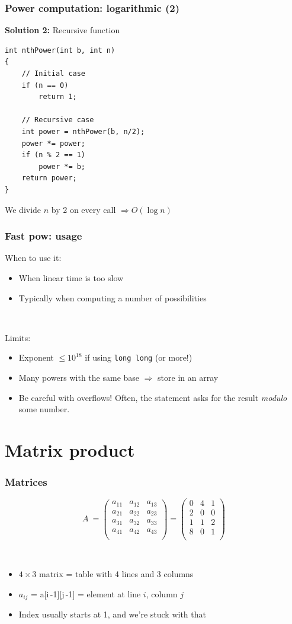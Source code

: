 \documentclass[12pt]{beamer}
\begin{document}
\begin{frame}[fragile]
\frametitle{Power computation: logarithmic (2)}
\textbf{Solution 2:} Recursive function
\begin{lstlisting}[frame=single]
int nthPower(int b, int n)
{
    // Initial case
    if (n == 0)
        return 1;
    
    // Recursive case
    int power = nthPower(b, n/2);
    power *= power;
    if (n % 2 == 1)
        power *= b;
    return power;
}
\end{lstlisting}
We divide $n$ by 2 on every call $\Rightarrow O(\log n)$
\end{frame}

\begin{frame}
\frametitle{Fast pow: usage}
When to use it:
\begin{itemize}
\item When linear time is too slow
\item Typically when computing a number of possibilities
\end{itemize}

~

Limits:
\begin{itemize}
\item Exponent $\leq 10^{18}$ if using \texttt{long long} (or more!)
\item Many powers with the same base $\Rightarrow$ store in an array
\item Be careful with overflows! Often, the statement asks for the result \emph{modulo} some number.
\end{itemize}
\end{frame}

\section{Matrix product}

\begin{frame}
\frametitle{Matrices}
\[
A\ =
\left(
\begin{array}{ccc}
a_{11}&a_{12}&a_{13}\\
a_{21}&a_{22}&a_{23}\\
a_{31}&a_{32}&a_{33}\\
a_{41}&a_{42}&a_{43}\\
\end{array}
\right)
=
\left(
\begin{array}{ccc}
0&4&1\\
2&0&0\\
1&1&2\\
8&0&1\\
\end{array}
\right)
\]

~

\begin{itemize}
\item $4 \times 3$ matrix = table with 4 lines and 3 columns
\item $a_{ij}$ = a[i\,-1][j\,-1] = element at line $i$, column $j$
\item Index usually starts at 1, and we're stuck with that
\end{itemize}
\end{frame}
\end{document}
